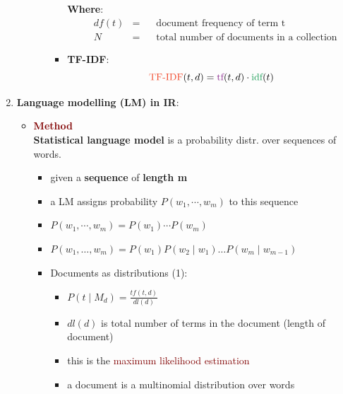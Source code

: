\begin{enumerate}
\begin{itemize}
\begin{itemize}
\begin{itemize}
                \textbf{Where}:
                $$
                \begin{aligned}
                    &df(t) &= \;\;\; &\text{document frequency of term t} \\
                    &N &= \;\;\; &\text{total number of documents in a collection}
                \end{aligned}
                $$
                \item \textbf{\textcolor{RedOrange}{TF-IDF}}:
                $$
                \text{\textcolor{RedOrange}{TF-IDF}}(t,d) = \text{\textcolor{Fuchsia}{tf}}(t,d) \cdot \text{\textcolor{ForestGreen}{idf}}(t)
                $$
            \end{itemize}
        \end{itemize}
    \end{itemize}
    \item \textbf{Language modelling (LM) in IR}:
    \begin{itemize}
        \item \textbf{\textcolor{Maroon}{Method}} \\
        \textbf{Statistical language model} is a probability distr. over sequences of words.
        \begin{itemize}
            \item given a \textbf{sequence} of \textbf{length m}
            \item a LM assigns probability $P(w_1, \cdots, w_m)$ to this sequence 
            \vspace{0.2cm}
            \item{ $P(w_1, \cdots, w_m) = P(w_1) \cdots P(w_m)$}
            \item{ $P\left(w_{1}, \ldots, w_{m}\right)=P\left(w_{1}\right) P\left(w_{2} \mid w_{1}\right) \ldots P\left(w_{m} \mid w_{m-1}\right)$}
            \item Documents as distributions (1):
            \begin{itemize}
                \item{ $P\left(t \mid M_{d}\right)=\frac{t f(t, d)}{d l(d)}$}
                \item $d l(d)$ is total number of terms in the document (length of document)
                \item this is the \textcolor{Maroon}{maximum likelihood estimation}
                \item a document is a multinomial distribution over words

\end{itemize}
\end{itemize}
\end{itemize}
\end{enumerate}
